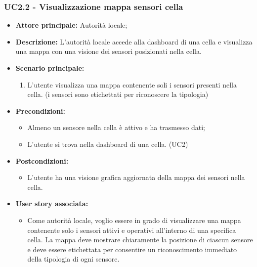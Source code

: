 \subsubsection{UC2.2 - Visualizzazione mappa sensori cella}
\begin{itemize}
    \item \textbf{Attore principale:} Autorità locale;
    \item \textbf{Descrizione:} L'autorità locale accede alla dashboard di una cella e visualizza una mappa con una visione dei sensori posizionati nella cella.
    \item \textbf{Scenario principale:}
          \begin{enumerate}
              \item L'utente visualizza una mappa contenente soli i sensori presenti nella cella. (i sensori sono etichettati per riconoscere la tipologia)
          \end{enumerate}
    \item \textbf{Precondizioni:}
          \begin{itemize}
              \item  Almeno un sensore nella cella è attivo e ha trasmesso dati;
              \item L'utente si trova nella dashboard di una cella. (UC2)
          \end{itemize}
    \item \textbf{Postcondizioni:}
          \begin{itemize}
              \item      L'utente ha una visione grafica aggiornata della mappa dei sensori nella cella.
          \end{itemize}
    \item \textbf{User story associata:}
          \begin{itemize}
              \item Come autorità locale, voglio essere in grado di visualizzare una mappa contenente solo i sensori attivi e operativi all'interno di una specifica cella. La mappa deve mostrare chiaramente la posizione di ciascun sensore e deve essere etichettata per consentire un riconoscimento immediato della tipologia di ogni sensore.
          \end{itemize}
\end{itemize}